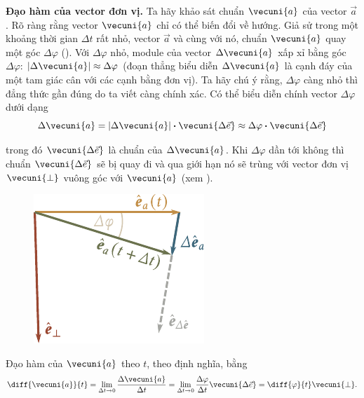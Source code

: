 \textbf{Đạo hàm của vector đơn vị.} Ta hãy khảo sát chuẩn $\vecuni{a}$ của vector $\vec{a}$. Rõ ràng rằng vector $\vecuni{a}$ chỉ có thể biến đổi về hướng. Giả sử trong một khoảng thời gian $\Delta t$ rất nhỏ, vector $\vec{a}$ và cùng với nó, chuẩn $\vecuni{a}$ quay một góc $\Delta\varphi$ (). Với $\Delta\varphi$ nhỏ, module của vector $\Delta\vecuni{a}$ xấp xỉ bằng góc $\Delta\varphi$: $|\Delta\vecuni{a}|\approx\Delta\varphi$ (đoạn thẳng biểu diễn $\Delta\vecuni{a}$ là cạnh đáy của một tam giác cân với các cạnh bằng đơn vị). Ta hãy chú ý rằng, $\Delta\varphi$ càng nhỏ thì đẳng thức gần đúng do ta viết càng chính xác. Có thể biểu diễn chính vector $\Delta\varphi$ dưới dạng
\begin{equation*}
\Delta\vecuni{a} = |\Delta\vecuni{a}| \boldsymbol{\cdot} \vecuni{\Delta\vec{e}} \approx \Delta\varphi \boldsymbol{\cdot} \vecuni{\Delta\vec{e}}
\end{equation*}

\noindent
trong đó $\vecuni{\Delta\vec{e}}$ là chuẩn của $\Delta\vecuni{a}$. Khi $\Delta\varphi$ dần tới không thì chuẩn $\vecuni{\Delta\vec{e}}$ sẽ bị quay đi và qua giới hạn nó sẽ trùng với vector đơn vị $\vecuni{\perp}$ vuông góc với $\vecuni{a}$ (xem ).

\begin{figure}[!htb]
	\begin{center}
		\includegraphics[scale=0.95]{figures/ch_01/fig_1_19.pdf}
		\caption[]{}
		\label{fig:1_19}
	\end{center}
\end{figure}

Đạo hàm của $\vecuni{a}$ theo $t$, theo định nghĩa, bằng
\begin{equation*}
\diff{\vecuni{a}}{t} = \lim_{\Delta t\to 0} \frac{\Delta\vecuni{a}}{\Delta t} = \lim_{\Delta t\to 0} \frac{\Delta\varphi}{\Delta t}\vecuni{\Delta\vec{e}} = \diff{\varphi}{t}\vecuni{\perp}.
\end{equation*}

